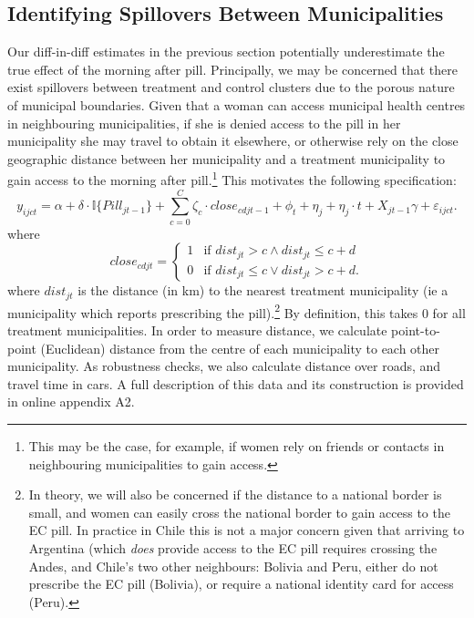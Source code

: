 \subsection{Identifying Spillovers Between Municipalities}
\label{TEENsscn:spilloverID}
Our diff-in-diff estimates in the previous section potentially underestimate the 
true effect of the morning after pill.  Principally, we may be concerned that
there exist spillovers between treatment and control clusters due to the porous
nature of municipal boundaries. Given that a woman can access municipal health
centres in neighbouring municipalities, if she is denied access to the pill in 
her municipality she may travel to obtain it elsewhere, or otherwise rely on the 
close geographic distance between her municipality and a treatment municipality 
to gain access to the morning after pill.\footnote{This may be the case, for 
example, if women rely on friends or contacts in neighbouring municipalities to 
gain access.}  This motivates the following specification:
\begin{equation}
 \label{TEENeqn:spillover}
y_{ijct} = \alpha + \delta\cdot \mathbb{I}\{Pill_{jt-1}\} + 
\sum_{c=0}^C\zeta_c\cdot close_{cdjt-1} + \phi_t + \eta_j + \eta_j\cdot t +
X_{jt-1}\gamma + \varepsilon_{ijct}.
\end{equation}
where
\[
 close_{cdjt} =
  \begin{cases}
   1 & \text{if } dist_{jt} > c \wedge dist_{jt}\leq c+d   \\
   0 & \text{if } dist_{jt} \leq c \vee  dist_{jt}>c+d.
  \end{cases}
\]
where $dist_{jt}$ is the distance (in km) to the nearest treatment municipality 
(ie a municipality which reports prescribing the pill).\footnote{In theory, we
will also be concerned if the distance to a national border is small, and women
can easily cross the national border to gain access to the EC pill.  In practice
in Chile this is not a major concern given that arriving to Argentina (which
\emph{does} provide access to the EC pill requires crossing the Andes, and 
Chile's two other neighbours: Bolivia and Peru, either do not prescribe the EC
pill (Bolivia), or require a national identity card for access (Peru).}  By 
definition, this takes 0 for all treatment municipalities.  In order to measure 
distance, we calculate point-to-point (Euclidean) distance from the centre of each 
municipality to each other municipality. As robustness checks, we also calculate 
distance over roads, and travel time in cars. A full description of this data 
and its construction is provided in online appendix A2.

